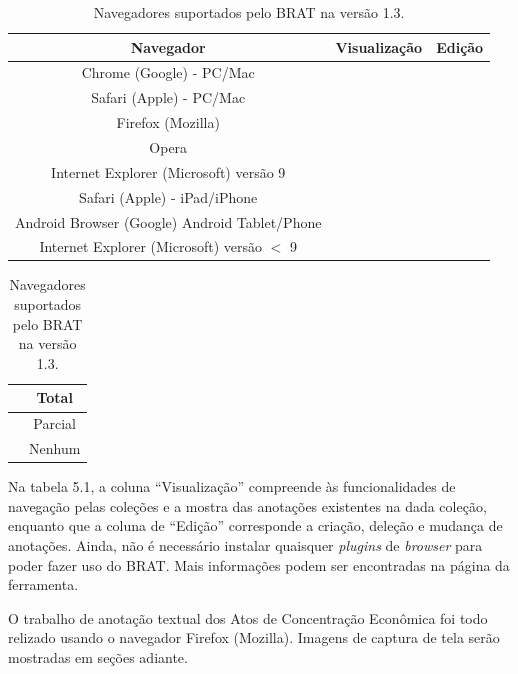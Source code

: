 \documentclass[11pt]{report}
\newcommand{\quotes}[1]{``#1''}
\begin{document}
\begin{table}[h!]
  \centering
  \def\arraystretch{0.97}
  \begin{tabular}{| c | c | c |}
    \hline
    Navegador & Visualização & Edição \\
    \hline\hline
    Chrome (Google) - PC/Mac                      & \cellcolor{strong} & \cellcolor{strong}   \\ \hline
    Safari (Apple) - PC/Mac                       & \cellcolor{strong} & \cellcolor{strong}   \\ \hline
    Firefox (Mozilla)                             & \cellcolor{strong} & \cellcolor{moderate} \\ \hline
    Opera                                         & \cellcolor{strong} & \cellcolor{moderate} \\ \hline
    Internet Explorer (Microsoft) versão 9        & \cellcolor{strong} & \cellcolor{moderate} \\ \hline
    Safari (Apple) - iPad/iPhone                  & \cellcolor{strong} & \cellcolor{moderate} \\ \hline
    Android Browser (Google) Android Tablet/Phone & \cellcolor{strong} & \cellcolor{weak}     \\ \hline
    Internet Explorer (Microsoft) versão $<$ 9    & \cellcolor{weak}   & \cellcolor{weak}     \\ \hline
  \end{tabular}
  \begin{tabular}{| c | c |}
    \hline
    \cellcolor{strong} & Total \\ \hline
    \cellcolor{moderate} & Parcial \\ \hline
    \cellcolor{weak} & Nenhum \\ \hline
  \end{tabular}
  \caption{Navegadores suportados pelo BRAT na versão 1.3.}
\end{table}

Na tabela 5.1, a coluna \quotes{Visualização} compreende às funcionalidades de navegação pelas coleções e a mostra das anotações existentes na dada coleção, enquanto
que a coluna de \quotes{Edição} corresponde a criação, deleção e mudança de anotações. Ainda, não é necessário instalar quaisquer \textit{plugins} de \textit{browser}
para poder fazer uso do BRAT. Mais informações podem ser encontradas na página da ferramenta.

O trabalho de anotação textual dos Atos de Concentração Econômica foi todo relizado usando o navegador Firefox (Mozilla).
Imagens de captura de tela serão mostradas em seções adiante.
\end{document}
